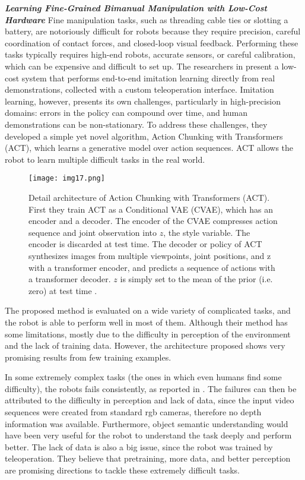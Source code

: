 \textbf{\textit{Learning Fine-Grained Bimanual Manipulation with
Low-Cost Hardware}} \quad
Fine manipulation tasks, such as threading cable ties or slotting a battery, are notoriously difficult
for robots because they require precision, careful coordination of contact forces, and closed-loop 
visual feedback. Performing these tasks typically requires high-end robots, accurate sensors, 
or careful calibration, which can be expensive and difficult to set up. 
The researchers in \cite{tony2023bimanual} present a low-cost system that performs
end-to-end imitation learning directly from real demonstrations, collected with a custom
teleoperation interface. Imitation learning, however, presents its own challenges, 
particularly in high-precision domains: errors in the policy can compound over time,
and human demonstrations can be non-stationary. To address these challenges, they developed a simple yet 
novel algorithm, Action Chunking with Transformers (ACT), which learns a generative
model over action sequences. ACT allows the robot to learn multiple difficult tasks in the real world.

\begin{figure}[H]
	\centering
	\texttt{[image: img17.png]}
	\captionsetup{width=1\linewidth}
	\caption{Detail architecture of Action Chunking with Transformers (ACT).
	First they train ACT as a Conditional VAE (CVAE), which has an encoder and a decoder. 
	The encoder of the CVAE compresses action sequence and joint observation into $z$, the style variable.
	The encoder is discarded at test time. The decoder or policy of ACT synthesizes images from 
	multiple viewpoints, joint positions, and z with a transformer encoder, and 
	predicts a sequence of actions with a transformer decoder. $z$ is simply set to the mean of the prior
	(i.e. zero) at test time \cite{tony2023bimanual}.}
	\label{fig:img17}
\end{figure}

The proposed method is evaluated on a wide variety of complicated tasks, and the robot is able to
perform well in most of them. Although their method has some limitations, mostly due to the 
difficulty in perception of the environment and the lack of training data. However, the architecture
proposed shows very promising results from few training examples.

In some extremely complex tasks (the ones in which even humans find some difficulty),
the robots fails consistently, as reported in \cite{tony2023bimanual}. The failures can then be
attributed to the difficulty in perception and lack of data, since the input video sequences were
created from standard rgb cameras, therefore no depth information was available. Furthermore,
object semantic understanding would have been very useful for the robot to understand the task
deeply and perform better. The lack of data is also a big issue, since the robot was trained
by teleoperation. They believe that pretraining, more data, and better perception are promising
directions to tackle these extremely difficult tasks.


